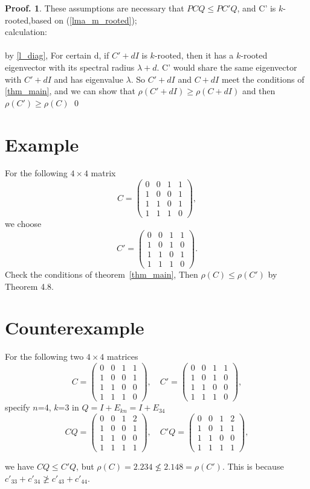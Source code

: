 \documentclass[12pt]{report}
\theoremstyle{plain}
\theoremstyle{definition}
\newtheorem{pof}[thm]{Proof.}
\begin{document}
\begin{pof}
These assumptions are necessary that $PCQ \leq PC'Q$, and C' is $k$-rooted,based on
 (\ref{lma_m_rooted});\\
 calculation:  \\
    \\
 by \ref{l_diag}, For certain d, if $C'+dI$ is $k$-rooted, then it has
  a $k$-rooted eigenvector with its spectral radius $\lambda + d$. C' would share the same
   eigenvector with $C'+dI$ and has eigenvalue $\lambda$. So $C'+dI$ and $C+dI$ meet the
    conditions of \ref{thm_main}, and we can show that $\rho(C' + dI) \geq \rho(C +dI)$ and
     then $\rho(C') \geq \rho(C)$  \qed
\end{pof}



\section{Example}
For the following $4\times 4$ matrix
$$C=\begin{pmatrix}
0 & 0 & 1 & 1\\
1 & 0 & 0 & 1\\
1 & 1 & 0 & 1\\
1 & 1 & 1 & 0
\end{pmatrix},$$
we choose
$$C'=\begin{pmatrix}
0 & 0 & 1 & 1\\
1 & 0 & 1 &  0\\
1 & 1 & 0 & 1\\
1 & 1 & 1 & 0
\end{pmatrix}.$$
Check the conditions of theorem~\ref{thm_main},   
Then
$\rho(C)\leq \rho(C')$ by Theorem 4.8. %




\section{Counterexample}
For the following two $4\times 4$ matrices
$$C=\begin{pmatrix}
0 & 0 & 1 & 1\\
1 & 0 & 0 & 1\\
1 & 1 & 0 & 0\\
1 & 1 & 1 & 0
\end{pmatrix},\quad C'=\begin{pmatrix}
0 & 0 & 1 & 1\\
1 & 0 & 1 &  0\\
1 & 1 & 0 & 0\\
1 & 1 & 1 & 0
\end{pmatrix},$$
specify $n$=4, $k$=3 in $Q = I +E_{kn} = I + E_{34}$  
$$CQ=\begin{pmatrix}
0 & 0 & 1 & 2\\
1 & 0 & 0 & 1\\
1 & 1 & 0 & 0\\
1 & 1 & 1 & 1
\end{pmatrix},\quad C'Q=\begin{pmatrix}
0 & 0 & 1 & 2\\
1 & 0 & 1 & 1\\
1 & 1 & 0 & 0\\
1 & 1 & 1 & 1
\end{pmatrix},$$

we have $CQ\leq C'Q$, but
$\rho(C)=2.234\not\leq 2.148= \rho(C')$.
This is because $c'_{33}+c'_{34}\not\geq c'_{43}+c'_{44}$.
\end{document}
